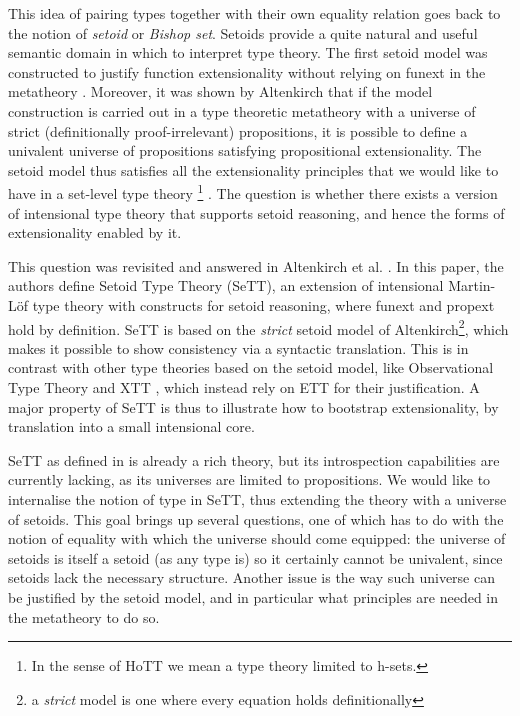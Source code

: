\documentclass[autoref]{llncs}
\begin{document}
This idea of pairing types together with their own equality relation goes back
to the notion of \emph{setoid} or \emph{Bishop set}. Setoids provide a quite
natural and useful semantic domain in which to interpret type theory. The first
setoid model was constructed to justify function extensionality without relying
on funext in the metatheory \cite{hofmann}. Moreover, it was shown by Altenkirch
\cite{setoid99} that if the model construction is carried out in a type
theoretic metatheory with a universe of strict (definitionally proof-irrelevant)
propositions, it is possible to define a univalent universe of propositions
satisfying propositional extensionality. The setoid model thus satisfies all the
extensionality principles that we would like to have in a set-level
type theory
\footnote{In the sense of HoTT we mean a type theory limited to h-sets.}
. The
question is whether there exists a version of intensional type theory that
supports setoid reasoning, and hence the forms of extensionality enabled by it.

This question was revisited and answered in Altenkirch et al. \cite{mpc19}. In
this paper, the authors define Setoid Type Theory (SeTT), an extension of
intensional Martin-L\"of type theory with constructs for setoid reasoning, where
funext and propext hold by definition. SeTT is based on the \emph{strict} setoid
model of Altenkirch\footnote{a \emph{strict} model is one where every equation
  holds definitionally}, which makes it possible to show consistency via a
syntactic translation. This is in contrast with other type theories based on the
setoid model, like Observational Type Theory \cite{alti:ott-conf}
and XTT \cite{xtt}, which instead rely on ETT for their justification. A major
property of SeTT is thus to illustrate how to bootstrap extensionality, by
translation into a small intensional core.

SeTT as defined in \cite{mpc19} is already a rich theory, but its introspection
capabilities are currently lacking, as its universes are limited to
propositions. We would like to internalise the notion of type in SeTT, thus
extending the theory with a universe of setoids.
%
This goal brings up several questions, one of which has to do with the notion of
equality with which the universe should come equipped: the universe of setoids
is itself a setoid (as any type is) so it certainly cannot be univalent, since
setoids lack the necessary structure.
%
Another issue is the way such universe can be justified by the setoid model, and
in particular what principles are needed in the metatheory to do so.
\end{document}
